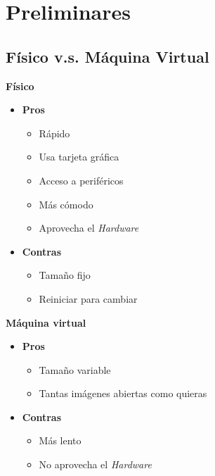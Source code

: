 \documentclass[aspectratio=43]{beamer}
\begin{document}
    \section{Preliminares}

    \subsection{Físico v.s. Máquina Virtual}
     \begin{frame}{\subsecname}{}
        \begin{multicols}{2}
            \textbf{Físico}
            \begin{itemize}
                \item \textbf{Pros}
                \begin{itemize}
                    \item Rápido
                    \item Usa tarjeta gráfica
                    \item Acceso a periféricos
                    \item Más cómodo
                    \item Aprovecha el \textit{Hardware}
                \end{itemize}
                \item \textbf{Contras}
                \begin{itemize}
                    \item Tamaño fijo
                    \item Reiniciar para cambiar
                \end{itemize}
            \end{itemize}
            \newpage
            \textbf{Máquina virtual}
            \begin{itemize}
                \item \textbf{Pros}
                \begin{itemize}
                    \item Tamaño variable
                    \item Tantas imágenes abiertas como quieras
                \end{itemize}
                \item \textbf{Contras}
                \begin{itemize}
                    \item Más lento
                    \item No aprovecha el \textit{Hardware}

\end{itemize}
\end{itemize}
\end{multicols}
\end{frame}
\end{document}

